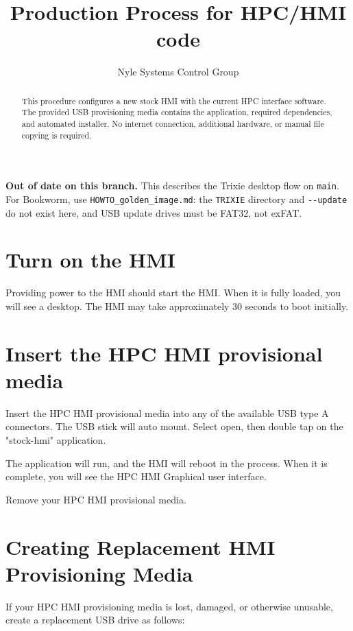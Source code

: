 \documentclass[]{article}
\title{Production Process for HPC/HMI code}
\author{Nyle Systems Control Group}
\begin{document}
\maketitle

\begin{abstract}
	This procedure configures a new stock HMI with the current HPC interface software. The provided USB provisioning media contains the application, required dependencies, and automated installer. No internet connection, additional hardware, or manual file copying is required.
\end{abstract}

\noindent\textbf{Out of date on this branch.} This describes the Trixie desktop flow on \texttt{main}. For Bookworm, use \texttt{HOWTO\_golden\_image.md}: the \texttt{TRIXIE} directory and \texttt{-{}-update} do not exist here, and USB update drives must be FAT32, not exFAT.


\section{Turn on the HMI}
Providing power to the HMI should start the HMI. When it is fully loaded, you will see a desktop. The HMI may take approximately 30 seconds to boot initially.

\section{Insert the HPC HMI provisional media}
Insert the HPC HMI provisional media into any of the available USB type A connectors. The USB stick will auto mount. Select open,  then double tap on the "stock-hmi" application. 

The application will run, and the HMI will reboot in the process. When it is complete, you will see the HPC HMI Graphical user interface. 

Remove your HPC HMI provisional media.
\newpage
\section*{Creating Replacement HMI Provisioning Media}

If your HPC HMI provisioning media is lost, damaged, or otherwise unusable, create a replacement USB drive as follows:
\end{document}

